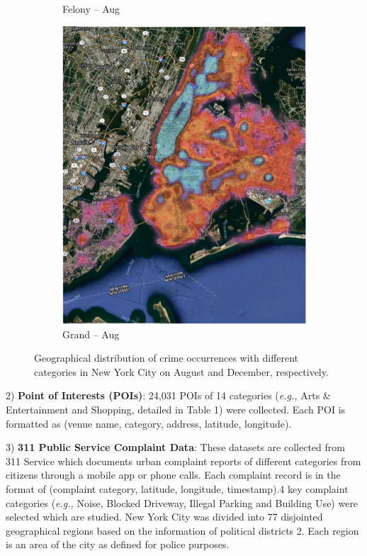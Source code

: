 \begin{figure}[t]
\begin{subfigure}{0.24\textwidth}
        \caption{Felony – Aug}
        \label{fig:subim3}
    \end{subfigure}
    \begin{subfigure}{0.24\textwidth}
        \centering
        \includegraphics[width=0.9\linewidth]{Chapter5/Images/grand.png}
        \caption{Grand – Aug}
        \label{fig:subim4}
    \end{subfigure}
 
    \caption{Geographical distribution of crime occurrences with different categories in New York City on August and December,
    respectively.}
    \label{fig:img2}
\end{figure}

2) \textbf{Point of Interests (POIs)}: 24,031 POIs of 14
categories (\emph{e.g.,} Arts \& Entertainment and Shopping, detailed in
Table 1) were collected. Each POI is formatted as (venue name, category, address, latitude, longitude).

3) \textbf{311 Public Service Complaint Data}: These datasets are collected from 311 Service which documents urban complaint reports
of different categories from citizens through a mobile app or phone
calls. Each complaint record is in the format of (complaint category,
latitude, longitude, timestamp).4 key complaint categories (\emph{e.g.,} Noise, Blocked Driveway, Illegal Parking and Building
Use) were selected which are studied.
New York City was divided into 77 disjointed geographical regions based on the information of political districts 2. Each region
is an area of the city as defined for police purposes.

